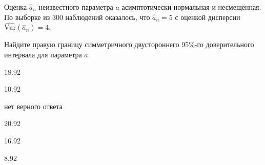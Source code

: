 
\begin{question}
Оценка \(\hat a_n\) неизвестного параметра \(a\) асимптотически
нормальная и несмещённая. По выборке из 300 наблюдений оказалось, что
\(\hat a_n = 5\) с оценкой дисперсии
\(\widehat{\mathrm{Var}}(\hat a_n) = 4\).

Найдите правую границу симметричного двустороннего 95\%-го
доверительного интервала для параметра \(a\).
\begin{answerlist}
  \item 18.92
  \item 10.92
  \item нет верного ответа
  \item 20.92
  \item 16.92
  \item 8.92
\end{answerlist}
\end{question}


